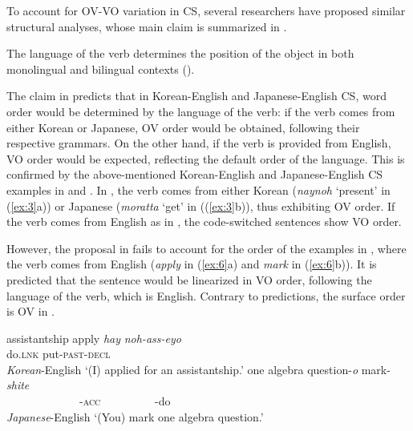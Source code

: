 To account for \ac{OV}-\ac{VO} variation in \ac{CS}, several researchers have proposed similar structural analyses, whose main claim is summarized in .

\begin{exe}
\ex\label{ex:5} The language of the verb determines the position of the object in both monolingual and bilingual contexts (\citealt{MacSwan1999,Mahootian1993,Nishimura1997}).\footnotemark
\end{exe}


The claim in  predicts that in Korean-English and Japanese-English \ac{CS}, word order would be determined by the language of the verb: if the verb comes from either Korean or Japanese, \ac{OV} order would be obtained, following their respective grammars. On the other hand, if the verb is provided from English, \ac{VO} order would be expected, reflecting the default order of the language. This is confirmed by the above-mentioned Korean-English and Japanese-English \ac{CS} examples in  and . In , the verb comes from either Korean (\textit{naynoh} ‘present’ in (\ref{ex:3}a)) or Japanese (\textit{moratta} ‘get’ in ((\ref{ex:3}b)), thus exhibiting \ac{OV} order. If  the verb comes from English as in , the code-switched sentences show \ac{VO} order.

However, the proposal in  fails to account for the order of the examples in , where the verb comes from English (\textit{apply} in (\ref{ex:6}a) and \textit{mark} in (\ref{ex:6}b)). It is predicted that the sentence would be linearized in \ac{VO} order, following the language of the verb, which is English. Contrary to predictions, the surface order is \ac{OV} in .

\begin{exe} \ex \label{ex:6}
    \begin{xlist}
        \ex \gll assistantship apply \textit{hay} \textit{noh-ass-eyo} \\
         {} {}  do.\textsc{lnk} put-\textsc{past}-\textsc{decl}		\\ \hfill 	\textit{Korean}-English
        \glt 	‘(I) applied for an assistantship.’   \citep{Park1990}
        \ex \gll one algebra question-\textit{o} mark-\textit{shite}				 \\
         {} {} {~~~~~~~~~~~~~}-\textsc{acc} {~~~~~~~~~}-do \\ \hfill \textit{Japanese}-English
        \glt	‘(You) mark one algebra question.’  \citep{Nishimura1995}
    \end{xlist}
\end{exe}


